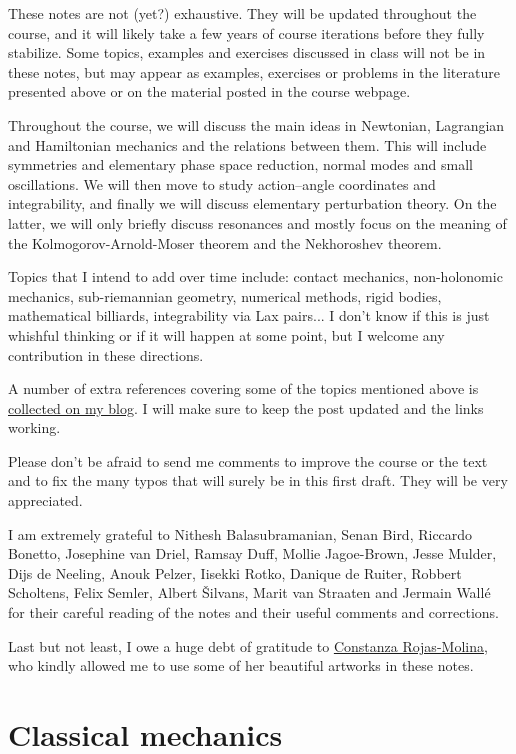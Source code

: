 \documentclass[english,fontsize=11pt,paper=b5]{scrbook}
\numberwithin{equation}{chapter}
\theoremstyle{definition}
\begin{document}
  These notes are not (yet?) exhaustive.
  They will be updated throughout the course, and it will likely take a few years of course iterations before they fully stabilize.
  Some topics, examples and exercises discussed in class will not be in these notes, but may appear as examples, exercises or problems in the literature presented above or on the material posted in the course webpage.

  Throughout the course, we will discuss the main ideas in Newtonian, Lagrangian and Hamiltonian mechanics and the relations between them.
  This will include symmetries and elementary phase space reduction, normal modes and small oscillations.
  We will then move to study action--angle coordinates and integrability, and finally we will discuss elementary perturbation theory.
  On the latter, we will only briefly discuss resonances and mostly focus on the meaning of the Kolmogorov-Arnold-Moser theorem and the Nekhoroshev theorem.

  Topics that I intend to add over time include: contact mechanics, non-holonomic mechanics, sub-riemannian geometry, numerical methods, rigid bodies, mathematical billiards, integrability via Lax pairs... I don't know if this is just whishful thinking or if it will happen at some point, but I welcome any contribution in these directions.

  A number of extra references covering some of the topics mentioned above is \href{https://www.mseri.me/links-from-hm/}{collected on my blog}. I will make sure to keep the post updated and the links working. \medskip

  Please don't be afraid to send me comments to improve the course or the text and to fix the many typos that will surely be in this first draft. They will be very appreciated.

  I am extremely grateful to Nithesh Balasubramanian, Senan Bird, Riccardo Bonetto, Jose\-phine van Driel, Ramsay Duff, Mollie Jagoe-Brown, Jesse Mulder, Dijs de Neeling, Anouk Pelzer, Iisekki Rotko, Danique de Ruiter, Robbert Scholtens, Felix Semler, Albert \v{S}ilvans, Marit van Straaten and Jermain Wall\'e for their careful reading of the notes and their useful comments and corrections.

  Last but not least, I owe a huge debt of gratitude to \href{https://crojasmolina.com}{Constanza Rojas-Molina}, who kindly allowed me to use some of her beautiful artworks in these notes.

  \chapter{Classical mechanics}
\end{document}
